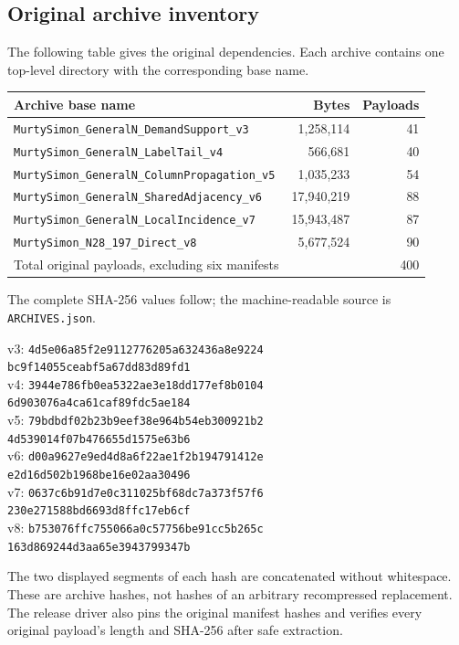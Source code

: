 \documentclass[11pt,a4paper]{article}
\begin{document}
\subsection{Original archive inventory}
The following table gives the original dependencies. Each archive contains one top-level directory with the corresponding base name.
\begin{center}\small\begin{tabular}{lrr}\toprule
Archive base name & Bytes & Payloads\\\midrule
\texttt{MurtySimon\_GeneralN\_DemandSupport\_v3} &1,258,114&41\\
\texttt{MurtySimon\_GeneralN\_LabelTail\_v4} &566,681&40\\
\texttt{MurtySimon\_GeneralN\_ColumnPropagation\_v5} &1,035,233&54\\
\texttt{MurtySimon\_GeneralN\_SharedAdjacency\_v6} &17,940,219&88\\
\texttt{MurtySimon\_GeneralN\_LocalIncidence\_v7} &15,943,487&87\\
\texttt{MurtySimon\_N28\_197\_Direct\_v8} &5,677,524&90\\\midrule
Total original payloads, excluding six manifests&&400\\\bottomrule
\end{tabular}\end{center}
The complete SHA-256 values follow; the machine-readable source is \texttt{ARCHIVES.json}.
\begin{flushleft}\small
v3: \texttt{4d5e06a85f2e9112776205a632436a8e9224}\\
\hspace*{1.6em}\texttt{bc9f14055ceabf5a67dd83d89fd1}\\[3pt]
v4: \texttt{3944e786fb0ea5322ae3e18dd177ef8b0104}\\
\hspace*{1.6em}\texttt{6d903076a4ca61caf89fdc5ae184}\\[3pt]
v5: \texttt{79bdbdf02b23b9eef38e964b54eb300921b2}\\
\hspace*{1.6em}\texttt{4d539014f07b476655d1575e63b6}\\[3pt]
v6: \texttt{d00a9627e9ed4d8a6f22ae1f2b194791412e}\\
\hspace*{1.6em}\texttt{e2d16d502b1968be16e02aa30496}\\[3pt]
v7: \texttt{0637c6b91d7e0c311025bf68dc7a373f57f6}\\
\hspace*{1.6em}\texttt{230e271588bd6693d8ffc17eb6cf}\\[3pt]
v8: \texttt{b753076ffc755066a0c57756be91cc5b265c}\\
\hspace*{1.6em}\texttt{163d869244d3aa65e3943799347b}
\end{flushleft}
The two displayed segments of each hash are concatenated without whitespace. These are archive hashes, not hashes of an arbitrary recompressed replacement. The release driver also pins the original manifest hashes and verifies every original payload's length and SHA-256 after safe extraction.
\end{document}

